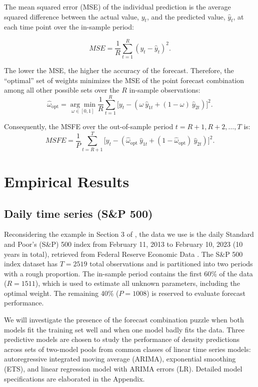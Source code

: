 \documentclass{monashthesis}
\begin{document}
The mean squared error (MSE) of the individual prediction is the average squared difference between the actual value, \(y_t\), and the predicted value, \(\hat y_t\), at each time point over the in-sample period:

\begin{equation*}
MSE = \frac{1}{R} \sum^R_{t=1} (y_t - \hat y_t)^2.
\end{equation*}

The lower the MSE, the higher the accuracy of the forecast. Therefore, the ``optimal'' set of weights minimizes the MSE of the point forecast combination among all other possible sets over the \(R\) in-sample observations:
\begin{equation*}
\hat{\omega}_{\text{opt}} = \underset{\omega \in [0,1]}{\arg\min} \frac{1}{R} \sum^R_{t=1} \Big[y_t - (\omega \ \hat y_{1t} + (1-\omega) \ \hat y_{2t})\Big]^2.
\end{equation*}

Consequently, the MSFE over the out-of-sample period \(t = R+1, R+2, \dots, T\) is:
\begin{equation*}
MSFE = \frac{1}{P} \sum^T_{t = R+1} \Big[y_t - (\hat{\omega}_{\text{opt}} \ \hat y_{1t} + (1-\hat{\omega}_{\text{opt}}) \ \hat y_{2t}) \Big]^2.
\end{equation*}

\hypertarget{empirical-results}{%
\chapter{Empirical Results}\label{empirical-results}}

\hypertarget{sp500}{%
\section{Daily time series (S\&P 500)}\label{sp500}}

Reconsidering the example in Section 3 of \textcite{GA11}, the data we use is the daily Standard and Poor's (S\&P) 500 index from February 11, 2013 to February 10, 2023 (10 years in total), retrieved from Federal Reserve Economic Data \autocite{SP500}. The S\&P 500 index dataset has \(T = 2519\) total observations and is partitioned into two periods with a rough proportion. The in-sample period contains the first 60\% of the data (\(R = 1511\)), which is used to estimate all unknown parameters, including the optimal weight. The remaining 40\% (\(P = 1008\)) is reserved to evaluate forecast performance.

We will investigate the presence of the forecast combination puzzle when both models fit the training set well and when one model badly fits the data. Three predictive models are chosen to study the performance of density predictions across sets of two-model pools from common classes of linear time series models: autoregressive integrated moving average (ARIMA), exponential smoothing (ETS), and linear regression model with ARIMA errors (LR). Detailed model specifications are elaborated in the Appendix.
\end{document}

